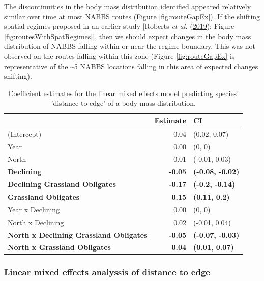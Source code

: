 \documentclass[print]{nuthesis}
\begin{document}
The discontinuities in the body mass distribution identified appeared relatively similar over time at most NABBS routes (Figure \ref{fig:routeGapEx}). If the shifting spatial regimes proposed in an earlier study {[}Roberts \emph{et al.} (\protect\hyperlink{ref-roberts2019shifting}{2019}); Figure \ref{fig:routesWithSpatRegimes}{]}, then we should expect changes in the body mass distribution of NABBS falling within or near the regime boundary. This was not observed on the routes falling within this zone (Figure \ref{fig:routeGapEx} is representative of the \textasciitilde5 NABBS locations falling in this area of expected changes shifting).
\begin{table}[t]

\caption{\label{tab:lmeTab}Coefficient estimates for the linear mixed effects model predicting species' 'distance to edge' of a body mass distribution.}
\centering
\begin{tabular}{lrl}
\toprule
  & Estimate & CI\\
\midrule
(Intercept) & 0.04 & (0.02, 0.07)\\
Year & 0.00 & (0, 0)\\
North & 0.01 & (-0.01, 0.03)\\
\textbf{Declining} & \textbf{-0.05} & \textbf{(-0.08, -0.02)}\\
\textbf{Declining Grassland Obligates} & \textbf{-0.17} & \textbf{(-0.2, -0.14)}\\
\addlinespace
\textbf{Grassland Obligates} & \textbf{0.15} & \textbf{(0.11, 0.2)}\\
Year x Declining & 0.00 & (0, 0)\\
North x Declining & 0.02 & (-0.01, 0.04)\\
\textbf{North x Declining Grassland Obligates} & \textbf{-0.05} & \textbf{(-0.07, -0.03)}\\
\textbf{North x Grassland Obligates} & \textbf{0.04} & \textbf{(0.01, 0.07)}\\
\bottomrule
\end{tabular}
\end{table}
\hypertarget{linear-mixed-effects-analyssis-of-distance-to-edge}{%
\subsubsection{Linear mixed effects analyssis of distance to edge}\label{linear-mixed-effects-analyssis-of-distance-to-edge}}
\end{document}
